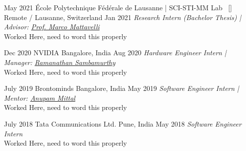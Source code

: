 \begin{experiences}
\researchexperience
    {May 2021}
    {École Polytechnique Fédérale de Lausanne | SCI-STI-MM Lab{\normalfont  ~ [\href{https://www.epfl.ch/labs/gramm/}{\small{\websiteSymbol}}]}}
    {Remote / Lausanne, Switzerland} {}
    {Jan 2021}
    {\textit{Research Intern (Bachelor Thesis) | Advisor:  \href{https://people.epfl.ch/marco.mattavelli?lang=en}{Prof. Marco Mattavelli}}\\
    Worked Here, need to word this properly 
    }
\emptySeparator

\researchexperience
    {Dec 2020}
    {NVIDIA}
    {Bangalore, India} {}
    {Aug 2020}
    {\textit{Hardware Engineer Intern | Manager:  \href{https://www.linkedin.com/in/ramanathan-sambamurthy-4540b9168}{Ramanathan Sambamurthy}}\\
    Worked Here, need to word this properly 
    }
\emptySeparator

\researchexperience
    {July 2019}
    {Brontominds}
    {Bangalore, India} {}
    {May 2019}
    {\textit{Software Engineer Intern | Mentor:  \href{https://in.linkedin.com/in/anupammittal}{Anupam Mittal}}\\
    Worked Here, need to word this properly 
    }
\emptySeparator

\researchexperience
    {July 2018}
    {Tata Communications Ltd.}
    {Pune, India} {}
    {May 2018}
    {\textit{Software Engineer Intern}\\
    Worked Here, need to word this properly 
    }
  
\end{experiences}
\vspace{-4mm}
